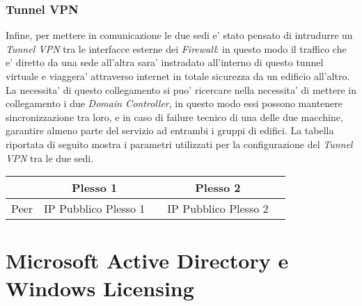 \documentclass{report}
\begin{document}
        \subsection{Tunnel VPN}
            Infine, per mettere in comunicazione le due sedi e' stato pensato di intrudurre un \emph{Tunnel VPN}
             tra le interfacce esterne dei \emph{Firewall}: in questo modo il traffico che e' diretto da una sede
             all’altra sara' instradato all’interno di questo tunnel virtuale e viaggera' attraverso internet in
             totale sicurezza da un edificio all’altro. La necessita' di questo collegamento si puo' ricercare nella
             necessita' di mettere in collegamento i due \emph{Domain Controller}, in questo modo essi possono mantenere
             sincronizzazione tra loro, e in caso di failure tecnico di una delle due macchine, garantire almeno parte 
             del servizio ad entrambi i gruppi di edifici.
            La tabella riportata di seguito mostra i parametri utilizzati per la configurazione del \emph{Tunnel VPN} tra le
             due sedi.
             \begin{center}
                 \begin{tabular}{ |c|c|c|c|c| }
                     \hline
                       & Plesso 1 &   & Plesso 2 &   \\
                     \hline \hline
                       Peer & IP Pubblico Plesso 1&   & IP Pubblico Plesso 2 &   \\
                     \hline
                 \end{tabular}
             \end{center}
    \chapter{Microsoft Active Directory e Windows Licensing}
        \author{Catone Mario}
\end{document}
